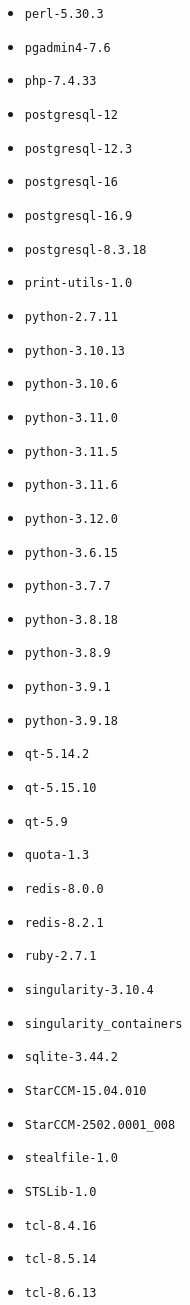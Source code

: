 \begin{multicols}{3}
\begin{itemize}
\item \verb|perl-5.30.3|
\item \verb|pgadmin4-7.6|
\item \verb|php-7.4.33|
\item \verb|postgresql-12|
\item \verb|postgresql-12.3|
\item \verb|postgresql-16|
\item \verb|postgresql-16.9|
\item \verb|postgresql-8.3.18|
\item \verb|print-utils-1.0|
\item \verb|python-2.7.11|
\item \verb|python-3.10.13|
\item \verb|python-3.10.6|
\item \verb|python-3.11.0|
\item \verb|python-3.11.5|
\item \verb|python-3.11.6|
\item \verb|python-3.12.0|
\item \verb|python-3.6.15|
\item \verb|python-3.7.7|
\item \verb|python-3.8.18|
\item \verb|python-3.8.9|
\item \verb|python-3.9.1|
\item \verb|python-3.9.18|
\item \verb|qt-5.14.2|
\item \verb|qt-5.15.10|
\item \verb|qt-5.9|
\item \verb|quota-1.3|
\item \verb|redis-8.0.0|
\item \verb|redis-8.2.1|
\item \verb|ruby-2.7.1|
\item \verb|singularity-3.10.4|
\item \verb|singularity_containers|
\item \verb|sqlite-3.44.2|
\item \verb|StarCCM-15.04.010|
\item \verb|StarCCM-2502.0001_008|
\item \verb|stealfile-1.0|
\item \verb|STSLib-1.0|
\item \verb|tcl-8.4.16|
\item \verb|tcl-8.5.14|
\item \verb|tcl-8.6.13|

\end{itemize}
\end{multicols}
